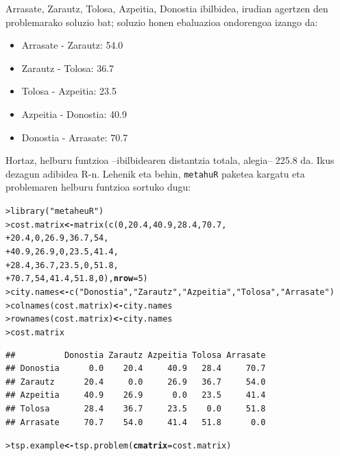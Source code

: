 \documentclass[eu]{ifirak}\usepackage[]{graphicx}\usepackage[]{color}
\makeatletter
\newcommand{\hlnum}[1]{\textcolor[rgb]{0.659,0.4,0.051}{#1}}%
\newcommand{\hlstr}[1]{\textcolor[rgb]{0.659,0.4,0.051}{#1}}%
\newcommand{\hlstd}[1]{\textcolor[rgb]{0,0,0}{#1}}%
\newcommand{\hlkwb}[1]{\textcolor[rgb]{0.549,0.114,0.412}{\textbf{#1}}}%
\newcommand{\hlkwc}[1]{\textcolor[rgb]{0.659,0.573,0.133}{\textbf{#1}}}%
\newcommand{\hlkwd}[1]{\textcolor[rgb]{0.659,0.133,0.482}{#1}}%
\newenvironment{kframe}{%
 \def\at@end@of@kframe{}%
 \ifinner\ifhmode%
  \def\at@end@of@kframe{\end{minipage}}%
  \begin{minipage}{\columnwidth}%
 \fi\fi%
 \def\FrameCommand##1{\hskip\@totalleftmargin \hskip-\fboxsep
 \colorbox{shadecolor}{##1}\hskip-\fboxsep
     \hskip-\linewidth \hskip-\@totalleftmargin \hskip\columnwidth}%
 \MakeFramed {\advance\hsize-\width
   \@totalleftmargin\z@ \linewidth\hsize
   \@setminipage}}%
 {\par\unskip\endMakeFramed%
 \at@end@of@kframe}
\newenvironment{knitrout}{}{} %
\newcommand{\code}[1]{\texttt{#1}}
\makeatother
\begin{document}
Arrasate, Zarautz, Tolosa, Azpeitia, Donostia ibilbidea, irudian agertzen den problemarako soluzio bat; soluzio honen ebaluazioa ondorengoa izango da:

\begin{itemize}
\item Arrasate - Zarautz: 54.0
\item Zarautz - Tolosa: 36.7
\item Tolosa - Azpeitia: 23.5
\item Azpeitia - Donostia: 40.9
\item Donostia - Arrasate: 70.7
\end{itemize}

Hortaz, helburu funtzioa --ibilbidearen distantzia totala, alegia-- 225.8 da. Ikus dezagun adibidea R-n. Lehenik eta behin, \code{metahuR} paketea kargatu eta problemaren helburu funtzioa sortuko dugu:

\begin{knitrout}
\color{fgcolor}\begin{kframe}
\begin{alltt}
\hlstd{> }\hlkwd{library}\hlstd{(}\hlstr{"metaheuR"}\hlstd{)}
\hlstd{> }\hlstd{cost.matrix} \hlkwb{<-} \hlkwd{matrix}\hlstd{(}\hlkwd{c}\hlstd{(}\hlnum{0} \hlstd{,} \hlnum{20.4} \hlstd{,} \hlnum{40.9} \hlstd{,} \hlnum{28.4} \hlstd{,} \hlnum{70.7} \hlstd{,}
\hlstd{+ }                        \hlnum{20.4} \hlstd{,} \hlnum{0} \hlstd{,} \hlnum{26.9} \hlstd{,} \hlnum{36.7} \hlstd{,} \hlnum{54} \hlstd{,}
\hlstd{+ }                        \hlnum{40.9} \hlstd{,} \hlnum{26.9} \hlstd{,} \hlnum{0} \hlstd{,} \hlnum{23.5} \hlstd{,} \hlnum{41.4} \hlstd{,}
\hlstd{+ }                        \hlnum{28.4} \hlstd{,} \hlnum{36.7} \hlstd{,} \hlnum{23.5} \hlstd{,} \hlnum{0} \hlstd{,} \hlnum{51.8} \hlstd{,}
\hlstd{+ }                        \hlnum{70.7} \hlstd{,} \hlnum{54} \hlstd{,} \hlnum{41.4} \hlstd{,} \hlnum{51.8} \hlstd{,} \hlnum{0}\hlstd{) ,} \hlkwc{nrow}\hlstd{=}\hlnum{5}\hlstd{)}
\hlstd{> }\hlstd{city.names} \hlkwb{<-} \hlkwd{c}\hlstd{(}\hlstr{"Donostia"}\hlstd{,}\hlstr{"Zarautz"}\hlstd{,}\hlstr{"Azpeitia"}\hlstd{,}\hlstr{"Tolosa"}\hlstd{,}\hlstr{"Arrasate"}\hlstd{)}
\hlstd{> }\hlkwd{colnames}\hlstd{(cost.matrix)} \hlkwb{<-} \hlstd{city.names}
\hlstd{> }\hlkwd{rownames}\hlstd{(cost.matrix)} \hlkwb{<-} \hlstd{city.names}
\hlstd{> }\hlstd{cost.matrix}
\end{alltt}
\begin{verbatim}
##          Donostia Zarautz Azpeitia Tolosa Arrasate
## Donostia      0.0    20.4     40.9   28.4     70.7
## Zarautz      20.4     0.0     26.9   36.7     54.0
## Azpeitia     40.9    26.9      0.0   23.5     41.4
## Tolosa       28.4    36.7     23.5    0.0     51.8
## Arrasate     70.7    54.0     41.4   51.8      0.0
\end{verbatim}
\begin{alltt}
\hlstd{> }\hlstd{tsp.example} \hlkwb{<-} \hlkwd{tsp.problem}\hlstd{(}\hlkwc{cmatrix} \hlstd{= cost.matrix)}
\end{alltt}
\end{kframe}
\end{knitrout}
\end{document}
